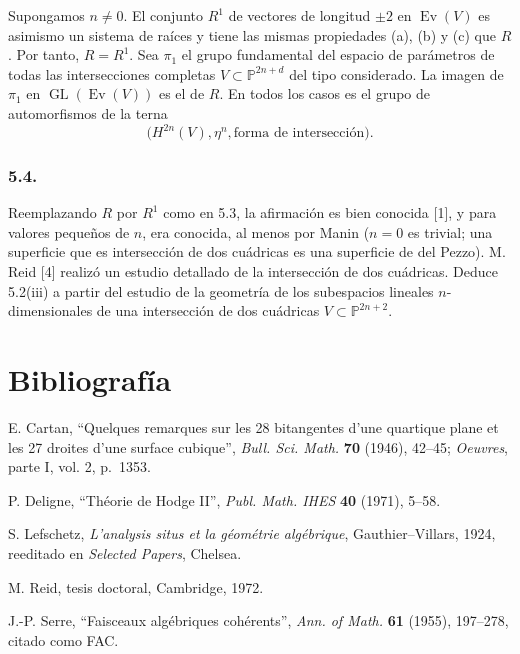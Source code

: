 Supongamos $n\ne0$. El conjunto $R^1$ de vectores de longitud $\pm2$
en $\operatorname{Ev}(V)$ es asimismo un sistema de raíces y tiene las
mismas propiedades (a), (b) y (c) que $R$. Por tanto, $R=R^1$. Sea
$\pi_1$ el grupo fundamental del espacio de parámetros de todas las
intersecciones completas $V\subset\mathbb P^{2n+d}$ del tipo
considerado. La imagen de $\pi_1$ en
$\operatorname{GL}(\operatorname{Ev}(V))$ es el
 de $R$. En todos los casos es el
grupo de automorfismos de la terna
\[
\bigl(H^{2n}(V),\eta^n,\text{forma de intersección}\bigr).
\]

\subsubsection*{5.4.}

Reemplazando $R$ por $R^1$ como en 5.3, la afirmación
 es bien conocida [1], y para valores pequeños de
$n$,  era conocida, al menos por Manin
($n=0$ es trivial; una superficie que es intersección de dos cuádricas
es una superficie de del Pezzo). M. Reid [4] realizó un estudio
detallado de la intersección de dos cuádricas. Deduce 5.2(iii) a partir
del estudio de la geometría de los subespacios lineales
$n$-dimensionales de una intersección de dos cuádricas
$V\subset\mathbb P^{2n+2}$.

\section*{Bibliografía}

\begin{enumerate}[label={[\arabic*]}]
\item E. Cartan, ``Quelques remarques sur les 28 bitangentes d'une
  quartique plane et les 27 droites d'une surface cubique'',
  \emph{Bull. Sci. Math.} \textbf{70} (1946), 42--45;
  \emph{Oeuvres}, parte I, vol. 2, p.~1353.
\item P. Deligne, ``Théorie de Hodge II'', \emph{Publ. Math. IHES}
  \textbf{40} (1971), 5--58.

\pageoriginale

\item S. Lefschetz, \emph{L'analysis situs et la géométrie algébrique},
  Gauthier--Villars, 1924, reeditado en \emph{Selected Papers},
  Chelsea.
\item M. Reid, tesis doctoral, Cambridge, 1972.
\item J.-P. Serre, ``Faisceaux algébriques cohérents'',
  \emph{Ann. of Math.} \textbf{61} (1955), 197--278, citado como FAC.
\end{enumerate}
